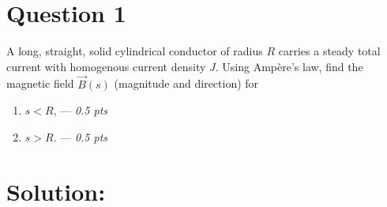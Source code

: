 \section*{Question 1}
A long, straight, solid cylindrical conductor of radius $R$ carries a steady total current with homogenous current density $J$.  Using Ampère’s law, find the magnetic field \(\vec{B}(s)\) (magnitude and direction) for
    \begin{enumerate}
      \item[(a)] \(s < R\), --- \textit{0.5 pts}
      \item[(b)] \(s > R\). --- \textit{0.5 pts}
    \end{enumerate}

\section*{Solution:}
